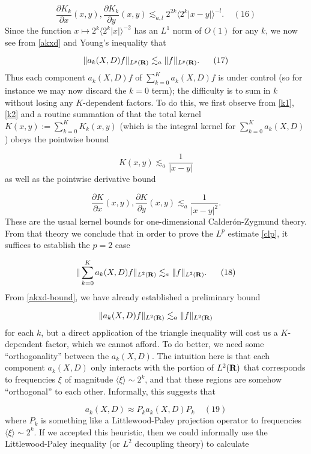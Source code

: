 \documentclass[11pt]{article}
\theoremstyle{definition}
\theoremstyle{remark}
\begin{document}
\[\displaystyle  \frac{\partial K_k}{\partial x}(x,y), \frac{\partial K_k}{\partial y}(x,y) \lesssim_{a,l} 2^{2k} \langle 2^k |x-y|\rangle^{-l}. \ \ \ \ \ (16)\]
 Since the function \({x \mapsto 2^k \langle 2^k |x| \rangle^{-2}}\) has an \({L^1}\) norm of \({O(1)}\) for any \({k}\), we now see from \eqref{akxd} and Young’s inequality that \label{akxd-bound}

\[\displaystyle  \| a_k(X,D) f\|_{L^p({\bf R})} \lesssim_a \|f\|_{L^p({\bf R})}. \ \ \ \ \ (17)\]
 Thus each component \({a_k(X,D) f}\) of \({\sum_{k=0}^K a_k(X,D) f}\) is under control (so for instance we may now discard the \({k=0}\) term); the difficulty is to sum in \({k}\) without losing any \({K}\)-dependent factors. To do this, we first observe from \eqref{k1}, \eqref{k2} and a routine summation of that the total kernel \({K(x,y) := \sum_{k=0}^K K_k(x,y)}\) (which is the integral kernel for \({\sum_{k=0}^K a_k(X,D)}\)) obeys the pointwise bound 

\[\displaystyle  K(x,y) \lesssim_a \frac{1}{|x-y|}\]
 as well as the pointwise derivative bound 

\[\displaystyle  \frac{\partial K}{\partial x}(x,y), \frac{\partial K}{\partial y}(x,y) \lesssim_{a} \frac{1}{|x-y|^2}.\]
 These are the usual kernel bounds for one-dimensional Calderón-Zygmund theory. From that theory we conclude that in order to prove the \({L^p}\) estimate \eqref{clp}, it suffices to establish the \({p=2}\) case \label{p2}

\[\displaystyle  \| \sum_{k=0}^K a_k(X,D) f\|_{L^2({\bf R})} \lesssim_{a} \|f\|_{L^2({\bf R})}. \ \ \ \ \ (18)\]
 From \eqref{akxd-bound}, we have already established a preliminary bound 

\[\displaystyle  \| a_k(X,D) f\|_{L^2({\bf R})} \lesssim_{a} \|f\|_{L^2({\bf R})}\]
 for each \({k}\), but a direct application of the triangle inequality will cost us a \({K}\)-dependent factor, which we cannot afford. To do better, we need some “orthogonality” between the \({a_k(X,D)}\). The intuition here is that each component \({a_k(X,D)}\) only interacts with the portion of \({L^2({\bf R})}\) that corresponds to frequencies \({\xi}\) of magnitude \({\langle \xi \rangle \sim 2^k}\), and that these regions are somehow “orthogonal” to each other. Informally, this suggests that \label{approx}

\[\displaystyle  a_k(X,D) \approx P_k a_k(X,D) P_k \ \ \ \ \ (19)\]
 where \({P_k}\) is something like a Littlewood-Paley projection operator to frequencies \({\langle \xi \rangle \sim 2^k}\). If we accepted this heuristic, then we could informally use the Littlewood-Paley inequality (or \({L^2}\) decoupling theory) to calculate 
\end{document}
